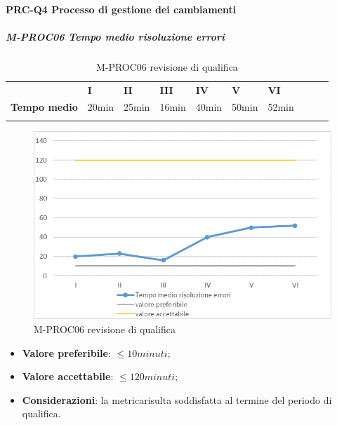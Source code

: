 \paragraph*{PRC-Q4 Processo di gestione dei cambiamenti}
\subparagraph{M-PROC06 Tempo medio risoluzione errori} \mbox{}
\begin{longtable}[H!] {						
		>{}p{35mm}  		
		>{}p{12mm}
		>{}p{12mm}		
		>{}p{12mm}		
		>{}p{12mm}		
		>{}p{12mm}		
		>{}p{12mm}
		>{}p{12mm}
		>{}p{12mm}
		>{}p{12mm}
	}
	\rowcolor{gray!50}
	\textbf{} & \textbf{I} & \textbf{II} & \textbf{III} & \textbf{IV} & \textbf{V} & \textbf{VI} \TBstrut \\ [2mm]
	\textbf{Tempo medio} & 20min & 25min & 16min & 40min & 50min & 52min \TBstrut \\ [2mm]
	\rowcolor{white}
	\caption{M-PROC06 revisione di qualifica}
\end{longtable}
\begin{figure}[H] 	
	\includegraphics[width=\linewidth]{./img/grafici/RQ6.png}	
	\caption{M-PROC06 revisione di qualifica}	
\end{figure}
\begin{itemize}
	\item \textbf{Valore preferibile}: $\le10minuti$;
	\item \textbf{Valore accettabile}: $\le120minuti$;
	\item \textbf{Considerazioni}: la metrica\glosp risulta soddisfatta al termine del periodo di qualifica.
\end{itemize}

